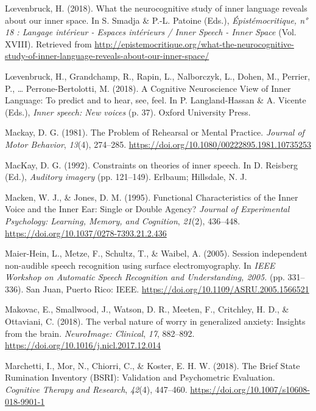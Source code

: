 \documentclass[a4paper,12pt,twoside,openright,oldfontcommands]{memoir}
\begin{document}
\leavevmode\hypertarget{ref-loevenbruck_what_2018}{}%
Lœvenbruck, H. (2018). What the neurocognitive study of inner language reveals about our inner space. In S. Smadja \& P.-L. Patoine (Eds.), \emph{Épistémocritique, n° 18 : Langage intérieur - Espaces intérieurs / Inner Speech - Inner Space} (Vol. XVIII). Retrieved from \url{http://epistemocritique.org/what-the-neurocognitive-study-of-inner-language-reveals-about-our-inner-space/}

\leavevmode\hypertarget{ref-loevenbruck_cognitive_2018}{}%
Lœvenbruck, H., Grandchamp, R., Rapin, L., Nalborczyk, L., Dohen, M., Perrier, P., \ldots{} Perrone-Bertolotti, M. (2018). A Cognitive Neuroscience View of Inner Language: To predict and to hear, see, feel. In P. Langland-Hassan \& A. Vicente (Eds.), \emph{Inner speech: New voices} (p. 37). Oxford University Press.

\leavevmode\hypertarget{ref-mackay_problem_1981}{}%
Mackay, D. G. (1981). The Problem of Rehearsal or Mental Practice. \emph{Journal of Motor Behavior}, \emph{13}(4), 274--285. \url{https://doi.org/10.1080/00222895.1981.10735253}

\leavevmode\hypertarget{ref-mackay_constraints_1992}{}%
MacKay, D. G. (1992). Constraints on theories of inner speech. In D. Reisberg (Ed.), \emph{Auditory imagery} (pp. 121--149). Erlbaum; Hillsdale, N. J.

\leavevmode\hypertarget{ref-macken_functional_1995}{}%
Macken, W. J., \& Jones, D. M. (1995). Functional Characteristics of the Inner Voice and the Inner Ear: Single or Double Agency? \emph{Journal of Experimental Psychology: Learning, Memory, and Cognition}, \emph{21}(2), 436--448. \url{https://doi.org/10.1037/0278-7393.21.2.436}

\leavevmode\hypertarget{ref-maier-hein_session_2005}{}%
Maier-Hein, L., Metze, F., Schultz, T., \& Waibel, A. (2005). Session independent non-audible speech recognition using surface electromyography. In \emph{IEEE Workshop on Automatic Speech Recognition and Understanding, 2005.} (pp. 331--336). San Juan, Puerto Rico: IEEE. \url{https://doi.org/10.1109/ASRU.2005.1566521}

\leavevmode\hypertarget{ref-makovac_verbal_2018}{}%
Makovac, E., Smallwood, J., Watson, D. R., Meeten, F., Critchley, H. D., \& Ottaviani, C. (2018). The verbal nature of worry in generalized anxiety: Insights from the brain. \emph{NeuroImage: Clinical}, \emph{17}, 882--892. \url{https://doi.org/10.1016/j.nicl.2017.12.014}

\leavevmode\hypertarget{ref-marchetti_brief_2018}{}%
Marchetti, I., Mor, N., Chiorri, C., \& Koster, E. H. W. (2018). The Brief State Rumination Inventory (BSRI): Validation and Psychometric Evaluation. \emph{Cognitive Therapy and Research}, \emph{42}(4), 447--460. \url{https://doi.org/10.1007/s10608-018-9901-1}
\end{document}
